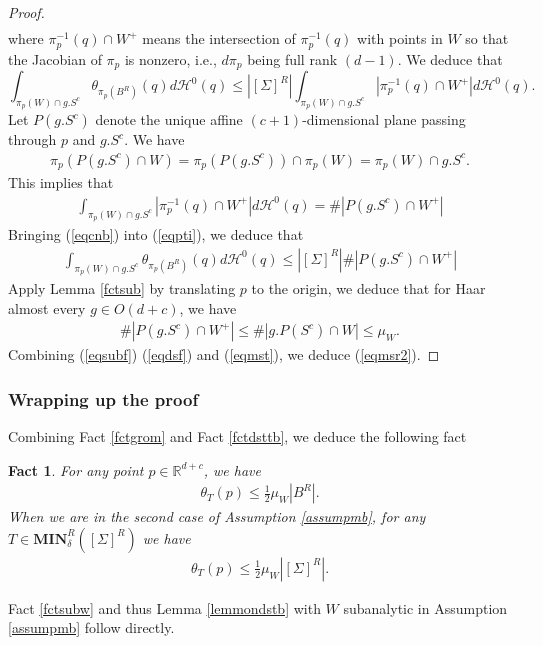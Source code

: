 \documentclass[11pt,a4paper]{amsart}
\numberwithin{equation}{section}
\newcommand{\mn}{\mathbf{MIN}}
\newcommand{\de}{\delta}
\newcommand{\Si}{\Sigma}
\newcommand{\m}{^{-1}}
\newcommand{\R}{\mathbb{R}}
\theoremstyle{plain}
\newtheorem{fact}{Fact}[subsection]
\theoremstyle{definition}
\numberwithin{equation}{subsection}
\begin{document}
\begin{proof}
\begin{align*}
	\end{align*}
	where $\pi_p\m(q)\cap W^+$ means the intersection of $\pi_p\m(q)$ with points in $W$ so that the Jacobian of $\pi_p$ is nonzero, i.e., $d\pi_p$ being full rank $(d-1)$. We deduce that 
	\begin{equation}\label{eqpti}
		\int_{\pi_p(W)\cap g.S^c}\theta_{\pi_p\left( B^R\right)}(q)d\mathcal{H}^0(q)\le\left|[\Si]^R\right|\int_{\pi_p(W)\cap g.S^c}|\pi_p\m(q)\cap W^+|d\mathcal{H}^0(q).	
	\end{equation}
	Let $P(g.S^c)$ denote the unique affine $(c+1)$-dimensional plane passing through $p$ and $g.S^c.$ We have
	\begin{align*}
		\pi_p(P(g.S^c)\cap W)=\pi_p(P(g.S^c))\cap \pi_p(W)=\pi_p(W)\cap g.S^c.
	\end{align*}
	This implies that
	\begin{align}\label{eqcnb}
		\int_{\pi_p(W)\cap g.S^c}
		|\pi_p\m(q)\cap W^+|d\mathcal{H}^0(q)=\#|	P(g.S^c)\cap W^+|
	\end{align}
	Bringing (\ref{eqcnb}) into (\ref{eqpti}), we deduce that 
	\begin{align}\label{eqdsf}
		\int_{\pi_p(W)\cap g.S^c}\theta_{\pi_p\left( B^R\right)}(q)d\mathcal{H}^0(q)\le\left|[\Si]^R\right|\#|	P(g.S^c)\cap W^+|
	\end{align}		
	Apply Lemma \ref{fctsub} by translating $p$ to the origin, we deduce that for Haar almost every $g\in O(d+c)$, we have
	\begin{align}\label{eqsubf}
		\#|	P(g.S^c)\cap W^+|\le\#|	g.P(S^c)\cap W|\le \mu_W.
	\end{align}
	Combining (\ref{eqsubf}) (\ref{eqdsf}) and (\ref{eqmst}), we deduce (\ref{eqmsr2}).
\end{proof}	
\subsubsection{Wrapping up the proof}
Combining Fact \ref{fctgrom} and Fact \ref{fctdsttb}, we deduce the following fact
\begin{fact}\label{fctsubts}
	For any point $p\in \R^{d+c}$, we have 
	\begin{align*}
		\theta_T(p)	\le\frac{1}{2}\mu_W\left|B^R\right|.
	\end{align*}
	When we are in the second case of Assumption \ref{assumpmb}, for any $T\in\mn^R_\de([\Si]^R)$ we have
	\begin{align*}
		\theta_T(p)	\le\frac{1}{2}\mu_W\left|[\Si]^R\right|.
	\end{align*}
\end{fact}Fact \ref{fctsubw} and thus Lemma \ref{lemmondstb} with $W$ subanalytic in Assumption \ref{assumpmb} follow directly. 
\end{document}

